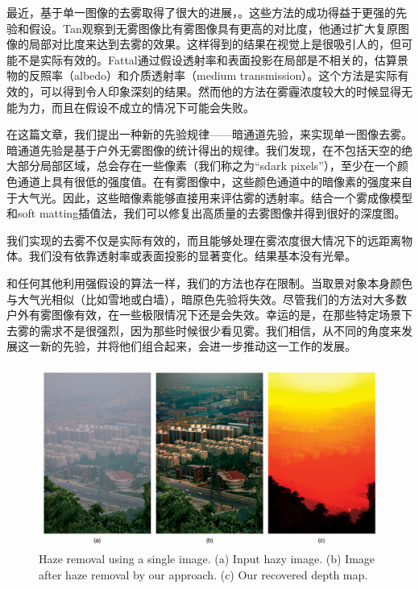 \documentclass{ctexart}
\begin{document}
最近，基于单一图像的去雾取得了很大的进展\cite{Fattal2008}，\cite{Tan2008}。这些方法的成功得益于更强的先验和假设。Tan\cite{Tan2008}观察到无雾图像比有雾图像具有更高的对比度，他通过扩大复原图像的局部对比度来达到去雾的效果。这样得到的结果在视觉上是很吸引人的，但可能不是实际有效的。Fattal\cite{Fattal2008}通过假设透射率和表面投影在局部是不相关的，估算景物的反照率（albedo）和介质透射率（medium transmission）。这个方法是实际有效的，可以得到令人印象深刻的结果。然而他的方法在雾霾浓度较大的时候显得无能为力，而且在假设不成立的情况下可能会失败。\par

在这篇文章，我们提出一种新的先验规律——暗通道先验，来实现单一图像去雾。暗通道先验是基于户外无雾图像的统计得出的规律。我们发现，在不包括天空的绝大部分局部区域，总会存在一些像素（我们称之为“sdark pixels”），至少在一个颜色通道上具有很低的强度值。在有雾图像中，这些颜色通道中的暗像素的强度来自于大气光。因此，这些暗像素能够直接用来评估雾的透射率。结合一个雾成像模型和soft matting插值法，我们可以修复出高质量的去雾图像并得到很好的深度图。\par

我们实现的去雾不仅是实际有效的，而且能够处理在雾浓度很大情况下的远距离物体。我们没有依靠透射率或表面投影的显著变化。结果基本没有光晕。\par

和任何其他利用强假设的算法一样，我们的方法也存在限制。当取景对象本身颜色与大气光相似（比如雪地或白墙），暗原色先验将失效。尽管我们的方法对大多数户外有雾图像有效，在一些极限情况下还是会失效。幸运的是，在那些特定场景下去雾的需求不是很强烈，因为那些时候很少看见雾。我们相信，从不同的角度来发展这一新的先验，并将他们组合起来，会进一步推动这一工作的发展。\par

\begin{figure}[tbp]
	\centering
	\includegraphics[width=\textwidth]{img/02.png}
	\caption{Haze removal using a single image. (a) Input hazy image. (b) Image after haze removal by our approach. (c) Our recovered depth map.}\label{fig:01}
\end{figure}
\end{document}
